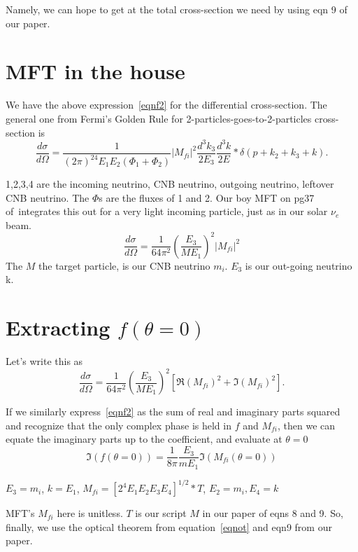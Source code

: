 \documentclass[reprint,onecolumn,superscriptaddress,preprintnumbers]{revtex4}%
\begin{document}
Namely, we can hope to get at the total cross-section we need by using eqn 9 of our paper.

\section{MFT in the house}
We have the above expression~\ref{eqnf2} for the differential cross-section. The general one from Fermi's Golden Rule for 2-particles-goes-to-2-particles cross-section is
\begin{equation}
\frac{d\sigma}{d\Omega} = \frac{1}{(2\pi)^24E_1E_2(\Phi_1+\Phi_2)} |M_{fi}|^2 \frac{d^3k_3}{2E_3} \frac{d^3k}{2E} *\delta(p+k_2+k_3+k).
\end{equation}

1,2,3,4 are the incoming neutrino, CNB neutrino, outgoing neutrino, leftover CNB neutrino. The $\Phi$s are the fluxes of 1 and 2. Our boy MFT on pg37 of~\cite{mft}integrates this out for a very light incoming particle, just as in our solar $\nu_e$ beam.
\begin{equation}
\frac{d\sigma}{d\Omega} = \frac{1}{64\pi^2}(\frac{E_3}{ME_1})^2 |M_{fi}|^2
\end{equation}
The $M$  the target particle, is our CNB neutrino $m_i$. $E_3$ is our out-going neutrino k. 

\section{Extracting $f(\theta=0)$}
Let's write this as 
\begin{equation}
\frac{d\sigma}{d\Omega} = \frac{1}{64\pi^2}(\frac{E_3}{ME_1})^2[\Re(M_{fi})^2+\Im(M_{fi})^2].
\end{equation}

If we similarly express~\ref{eqnf2} as the sum of real and imaginary parts squared and recognize that the only complex phase is held in $f$ and $M_{fi}$, then we can equate
the imaginary parts up to the coefficient, and evaluate at $\theta=0$
\begin{equation}
\Im (f(\theta=0)) = \frac{1}{8\pi}\frac{E_3}{mE_1}\Im(M_{fi}(\theta=0))
\end{equation}

$E_3 = m_i$, $k=E_1$, $M_{fi}=[2^4E_1E_2E_3E_4]^{1/2}*T$, $E_2=m_i, E_4=k$

MFT's $M_{fi}$ here is unitless. $T$ is our script $M$ in our paper of eqns 8 and 9. So, finally, we use the optical theorem from equation~\ref{eqnot} and eqn9 from our paper.
\end{document}
